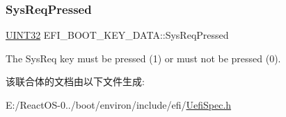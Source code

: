 \subsubsection{\texorpdfstring{Sys\+Req\+Pressed}{SysReqPressed}}
{\footnotesize\ttfamily \hyperlink{_processor_bind_8h_ae1e6edbbc26d6fbc71a90190d0266018}{U\+I\+N\+T32} E\+F\+I\+\_\+\+B\+O\+O\+T\+\_\+\+K\+E\+Y\+\_\+\+D\+A\+T\+A\+::\+Sys\+Req\+Pressed}

The Sys\+Req key must be pressed (1) or must not be pressed (0). 

该联合体的文档由以下文件生成\+:\begin{DoxyCompactItemize}
\item 
E\+:/\+React\+O\+S-\/0../boot/environ/include/efi/\hyperlink{_uefi_spec_8h}{Uefi\+Spec.\+h}\end{DoxyCompactItemize}
